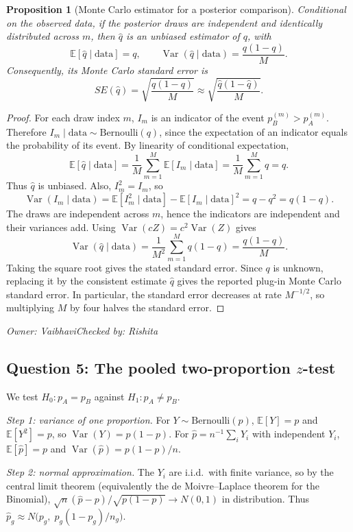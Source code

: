 \documentclass[11pt]{article}
\newtheorem{proposition}{Proposition}
\newcommand{\signoff}[2]{\par\smallskip\noindent\textit{Owner: #1\quad Checked by: #2}\par}
\newcommand{\E}{\mathbb{E}}
\newcommand{\Var}{\operatorname{Var}}
\begin{document}
\begin{proposition}[Monte Carlo estimator for a posterior comparison]
Conditional on the observed data, if the posterior draws are independent and identically distributed across $m$, then $\hat q$ is an unbiased estimator of $q$, with
\[
\E[\hat q\mid\text{data}]=q,\qquad
\Var(\hat q\mid\text{data})=\frac{q(1-q)}{M}.
\]
Consequently, its Monte Carlo standard error is
\[
SE(\hat q)=\sqrt{\frac{q(1-q)}{M}}
\approx \sqrt{\frac{\hat q(1-\hat q)}{M}}.
\]
\end{proposition}
\begin{proof}
For each draw index $m$, $I_m$ is an indicator of the event $p_B^{(m)}>p_A^{(m)}$. Therefore $I_m\mid\text{data}\sim\mathrm{Bernoulli}(q)$, since the expectation of an indicator equals the probability of its event. By linearity of conditional expectation,
\[
\E[\hat q\mid\text{data}]
=\frac{1}{M}\sum_{m=1}^M\E[I_m\mid\text{data}]
=\frac{1}{M}\sum_{m=1}^Mq=q.
\]
Thus $\hat q$ is unbiased. Also, $I_m^2=I_m$, so
\[
\Var(I_m\mid\text{data})
=\E[I_m^2\mid\text{data}]-\E[I_m\mid\text{data}]^2
=q-q^2=q(1-q).
\]
The draws are independent across $m$, hence the indicators are independent and their variances add. Using $\Var(cZ)=c^2\Var(Z)$ gives
\[
\Var(\hat q\mid\text{data})
=\frac{1}{M^2}\sum_{m=1}^M q(1-q)
=\frac{q(1-q)}{M}.
\]
Taking the square root gives the stated standard error. Since $q$ is unknown, replacing it by the consistent estimate $\hat q$ gives the reported plug-in Monte Carlo standard error. In particular, the standard error decreases at rate $M^{-1/2}$, so multiplying $M$ by four halves the standard error.
\end{proof}
\signoff{Vaibhavi}{Rishita}

\subsection{Question 5: The pooled two-proportion \texorpdfstring{$z$}{z}-test}
We test $H_0:p_A=p_B$ against $H_1:p_A\ne p_B$.

\emph{Step 1: variance of one proportion.} For $Y\sim\mathrm{Bernoulli}(p)$, $\E[Y]=p$ and $\E[Y^2]=p$, so $\Var(Y)=p(1-p)$. For $\hat p=n^{-1}\sum_iY_i$ with independent $Y_i$, $\E[\hat p]=p$ and $\Var(\hat p)=p(1-p)/n$.

\emph{Step 2: normal approximation.} The $Y_i$ are i.i.d.\ with finite variance, so by the central limit theorem (equivalently the de Moivre--Laplace theorem for the Binomial), $\sqrt n(\hat p-p)/\sqrt{p(1-p)}\to N(0,1)$ in distribution. Thus $\hat p_g\approx N\!\big(p_g,\;p_g(1-p_g)/n_g\big)$.
\end{document}
